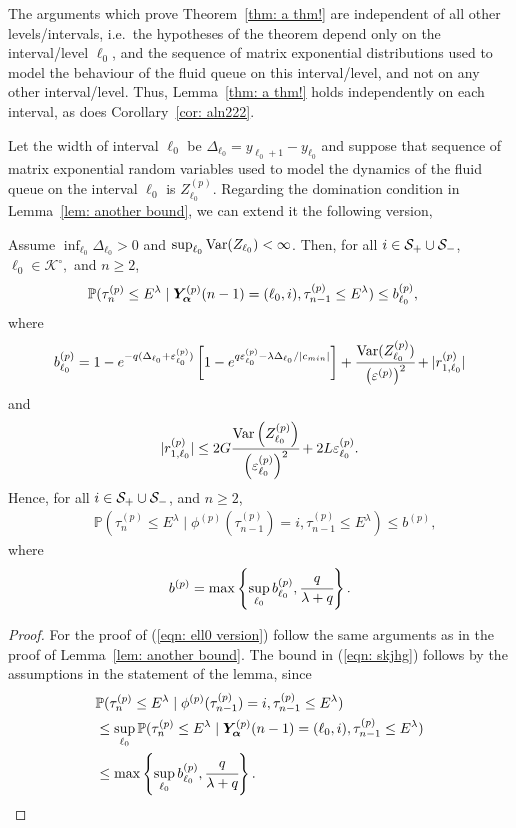 The arguments which prove Theorem~\ref{thm: a thm!} are independent of all other levels/intervals, i.e.~the hypotheses of the theorem depend only on the interval/level \({\ell_0}\), and the sequence of matrix exponential distributions used to model the behaviour of the fluid queue on this interval/level, and not on any other interval/level. Thus, Lemma~\ref{thm: a thm!} holds independently on each interval, as does Corollary~\ref{cor: aln222}.

Let the width of interval \({\ell_0}\) be \(\Delta_{\ell_0}=y_{\ell_0+1}-y_{\ell_0}\) and suppose that sequence of matrix exponential random variables used to model the dynamics of the fluid queue on the interval \({\ell_0}\) is \(Z_{\ell_0}^{(p)}\). Regarding the domination condition in Lemma~\ref{lem: another bound}, we can extend it the following version, 
\begin{lem}\label{lem: another bound sdfg}
	Assume \(\inf_{\ell_0}\Delta_{\ell_0}>0\) and \(\sup_{\ell_0}\mathrm{Var}(Z_{\ell_0})<\infty\). Then, for all \(i\in\mathcal S_+\cup \mathcal{S}_-\), \(\ell_0\in\mathcal K^\circ,\) and \(n\geq 2\), 
	\begin{align}
		&\mathbb P(\tau_n^{(p)}\leq E^\lambda \mid \bm{Y}_{\bm{\alpha}}^{(p)}(n-1) = (\ell_0,i), \tau_{n-1}^{(p)}\leq  E^\lambda ) \leq b_{\ell_0}^{(p)},\label{eqn: ell0 version}
	\end{align}
	where 
	\[b_{\ell_0}^{(p)} = 1-e^{-q(\Delta_{\ell_0}+\varepsilon_{\ell_0}^{(p)})}\left[1-e^{q\varepsilon_{\ell_0}^{(p)}-\lambda \Delta_{\ell_0}/|c_{min}|}\right] + \cfrac{\mathrm{Var}(Z_{\ell_0}^{(p)})}{\left(\varepsilon^{(p)}\right)^2} + |r_{1,\ell_0}^{(p)}| \]
	and  
	\[|r_{1,\ell_0}^{(p)}|\leq 2G\cfrac{\mathrm{Var} \left(Z_{\ell_0}^{(p)}\right)}{\left(\varepsilon_{\ell_0}^{(p)}\right)^2} + 2L\varepsilon_{\ell_0}^{(p)}.\]
	Hence, for all \(i\in\mathcal S_+\cup \mathcal{S}_-\), and \(n\geq 2\), 
	\begin{align}
		&\mathbb P(\tau_n^{(p)}\leq E^\lambda \mid \phi^{(p)}(\tau_{n-1}^{(p)})=i, \tau_{n-1}^{(p)}\leq  E^\lambda ) \leq b^{(p)}, \label{eqn: skjhg}
	\end{align}
	where 
	\[b^{(p)} = \max\left\{\sup_{\ell_0}b_{\ell_0}^{(p)}, \cfrac{q}{\lambda + q}\right\}.\]
\end{lem}
\begin{proof}
	For the proof of (\ref{eqn: ell0 version}) follow the same arguments as in the proof of Lemma~\ref{lem: another bound}. The bound in (\ref{eqn: skjhg}) follows by the assumptions in the statement of the lemma, since 
	\begin{align*}
		&\mathbb P(\tau_n^{(p)}\leq E^\lambda \mid \phi^{(p)}(\tau_{n-1}^{(p)})=i, \tau_{n-1}^{(p)}\leq  E^\lambda ) 
		\\&\leq \sup_{\ell_0} \mathbb P(\tau_n^{(p)}\leq E^\lambda \mid \bm{Y}_{\bm{\alpha}}^{(p)}(n-1) = (\ell_0, i), \tau_{n-1}^{(p)}\leq  E^\lambda ) 
		\\&\leq \max\left\{\sup_{\ell_0}b_{\ell_0}^{(p)}, \cfrac{q}{\lambda + q}\right\}.
	\end{align*}
\end{proof}
